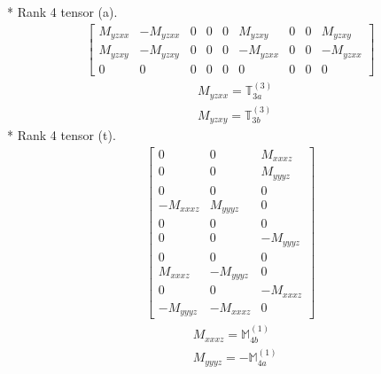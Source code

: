 \documentclass[fleqn,8pt,landscape]{jsarticle}
\begin{document}
* Rank 4 tensor (a).
\begin{align*}
\begin{bmatrix} M_{yzxx} & - M_{yzxx} & 0 & 0 & 0 & M_{yzxy} & 0 & 0 & M_{yzxy} \\ M_{yzxy} & - M_{yzxy} & 0 & 0 & 0 & - M_{yzxx} & 0 & 0 & - M_{yzxx} \\ 0 & 0 & 0 & 0 & 0 & 0 & 0 & 0 & 0 \end{bmatrix}
\end{align*}
\begin{align*}
& M_{yzxx} = \mathbb{T}_{3a}^{(3)} \\
& M_{yzxy} = \mathbb{T}_{3b}^{(3)}
\end{align*}
* Rank 4 tensor (t).
\begin{align*}
\begin{bmatrix} 0 & 0 & M_{xxxz} \\ 0 & 0 & M_{yyyz} \\ 0 & 0 & 0 \\ - M_{xxxz} & M_{yyyz} & 0 \\ 0 & 0 & 0 \\ 0 & 0 & - M_{yyyz} \\ 0 & 0 & 0 \\ M_{xxxz} & - M_{yyyz} & 0 \\ 0 & 0 & - M_{xxxz} \\ - M_{yyyz} & - M_{xxxz} & 0 \end{bmatrix}
\end{align*}
\begin{align*}
& M_{xxxz} = \mathbb{M}_{4b}^{(1)} \\
& M_{yyyz} = - \mathbb{M}_{4a}^{(1)}
\end{align*}
\end{document}
